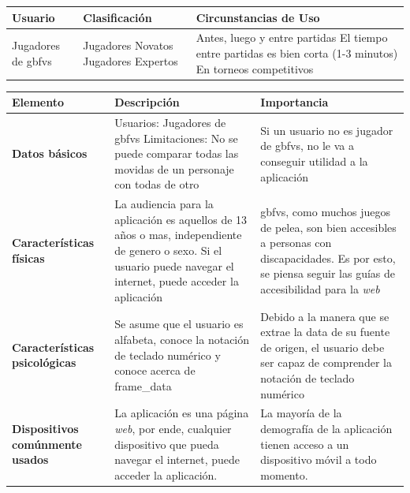 \begin{tabularx}{\textwidth}{| X | X | X |}
    \hline \textbf{Usuario} & \textbf{Clasificación} & \textbf{Circunstancias de Uso} \\
    \hline Jugadores de \gls{gbfvs} & Jugadores Novatos \newline Jugadores Expertos & Antes, luego y entre partidas \newline El tiempo entre partidas es bien corta (1-3 minutos) \newline  En torneos competitivos \\
    \hline
\end{tabularx}

\begin{tabularx}{\textwidth}{| X | X | X |}
    \hline \textbf{Elemento} & \textbf{Descripción} & \textbf{Importancia} \\
    \hline \textbf{Datos básicos} & Usuarios: Jugadores de \gls{gbfvs} \newline Limitaciones: No se puede comparar todas las movidas de un personaje con todas de otro  & Si un usuario no es jugador de \gls{gbfvs}, no le va a conseguir utilidad a la aplicación\\
    \hline \textbf{Características físicas} & La audiencia para la aplicación es aquellos de 13 años o mas, independiente de genero o sexo. Si el usuario puede navegar el internet, puede acceder la aplicación & \gls{gbfvs}, como muchos juegos de pelea, son bien accesibles a personas con discapacidades. Es por esto, se piensa seguir las guías de accesibilidad para la \textit{web}\\ 
    \hline \textbf{Características psicológicas} & Se asume que el usuario es alfabeta, conoce la notación de teclado numérico \cite{noauthor_numpad_nodate} y conoce acerca de \gls{frame_data} & Debido a la manera que se extrae la data de su fuente de origen, el usuario debe ser capaz de comprender la notación de teclado numérico\\
    \hline \textbf{Dispositivos comúnmente usados} & La aplicación es una página \textit{web}, por ende, cualquier dispositivo que pueda navegar el internet, puede acceder la aplicación.  & La mayoría de la demografía de la aplicación tienen acceso a un dispositivo móvil a todo momento. \\
\end{tabularx}

